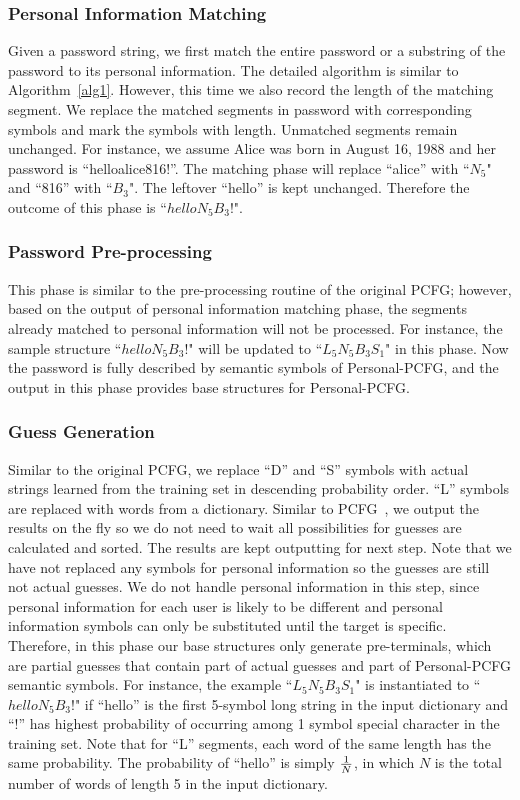  

\subsubsection{Personal Information Matching}
Given a password string, we first match the entire password or a
substring of the password to its personal information. The detailed
algorithm is similar to Algorithm~\ref{alg1}. However, this time we
also record the length of the matching segment. We replace the matched
segments in password with corresponding symbols and mark the symbols
with length. Unmatched segments remain unchanged. For instance, we
assume Alice was born in August 16, 1988 and her password is
``helloalice816!''. The matching phase will replace ``alice'' with
``$N_5$" and ``816'' with ``$B_3$". The leftover ``hello'' is kept
unchanged. Therefore the outcome of this phase is ``$helloN_5B_3!$".

\subsubsection{Password Pre-processing}
This phase is similar to the pre-processing routine of the original
PCFG; however, based on the output of personal information matching
phase, the segments already matched to personal information will not
be processed. For instance, the sample structure
``$helloN_5B_3!$" will be updated to ``$L_5N_5B_3S_1$" in this phase.  Now the
password is fully described by semantic symbols of Personal-PCFG, 
and the output in this phase provides base structures for
Personal-PCFG.

\subsubsection{Guess Generation}
Similar to the original PCFG, we replace ``D'' and ``S''
symbols with actual strings learned from the training set in
descending probability order. ``L'' symbols are replaced with words
from a dictionary. Similar to PCFG~\cite{weir2009password}, we output
the results on the fly so we do not need to wait all possibilities for
guesses are calculated and sorted. The results are kept outputting for
next step. Note that we have not replaced any symbols for personal
information so the guesses are still not actual guesses. We do not
handle personal information in this step, since personal information
for each user is likely to be different and personal information
symbols can only be substituted until the target is specific. 
%
Therefore, in this phase our base structures only generate
pre-terminals, which are partial guesses that contain part of actual
guesses and part of Personal-PCFG semantic symbols. For instance, the
example ``$L_5N_5B_3S_1$" is instantiated to ``$helloN_5B_3!$" if
``hello'' is the first 5-symbol long string in the input dictionary
and ``!'' has highest probability of occurring among 1 symbol special
character in the training set. Note that for ``L'' segments, each word
of the same length has the same probability. The probability of
``hello'' is simply $1\over N$, in which $N$ is the total number of
words of length 5 in the input dictionary.

